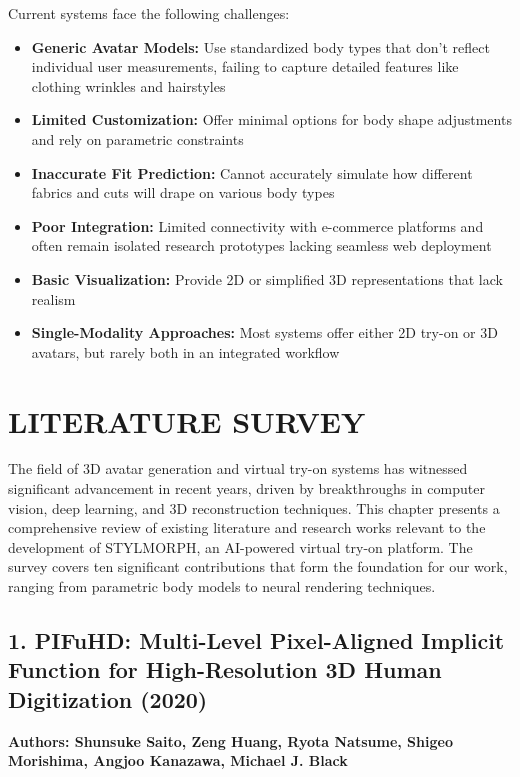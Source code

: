 \documentclass[12pt,a4paper,oneside]{report}
\begin{document}
Current systems face the following challenges:
\begin{itemize}
    \item \textbf{Generic Avatar Models:} Use standardized body types that don't reflect individual user measurements, failing to capture detailed features like clothing wrinkles and hairstyles
    \item \textbf{Limited Customization:} Offer minimal options for body shape adjustments and rely on parametric constraints
    \item \textbf{Inaccurate Fit Prediction:} Cannot accurately simulate how different fabrics and cuts will drape on various body types
    \item \textbf{Poor Integration:} Limited connectivity with e-commerce platforms and often remain isolated research prototypes lacking seamless web deployment
    \item \textbf{Basic Visualization:} Provide 2D or simplified 3D representations that lack realism
    \item \textbf{Single-Modality Approaches:} Most systems offer either 2D try-on or 3D avatars, but rarely both in an integrated workflow
\end{itemize}

\chapter{LITERATURE SURVEY}

The field of 3D avatar generation and virtual try-on systems has witnessed significant advancement in recent years, driven by breakthroughs in computer vision, deep learning, and 3D reconstruction techniques. This chapter presents a comprehensive review of existing literature and research works relevant to the development of STYLMORPH, an AI-powered virtual try-on platform. The survey covers ten significant contributions that form the foundation for our work, ranging from parametric body models to neural rendering techniques.

\section*{1. PIFuHD: Multi-Level Pixel-Aligned Implicit Function for High-Resolution 3D Human Digitization (2020)}

\textbf{Authors: Shunsuke Saito, Zeng Huang, Ryota Natsume, Shigeo Morishima, Angjoo Kanazawa, Michael J. Black}
\end{document}
